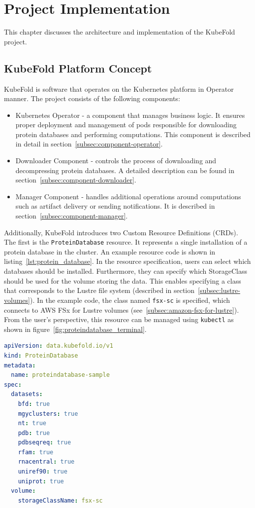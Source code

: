 \chapter{Project Implementation}
This chapter discusses the architecture and implementation of the KubeFold project.


\section{KubeFold Platform Concept}
KubeFold is software that operates on the Kubernetes platform in Operator manner.
The project consists of the following components:
\begin{itemize}
    \item Kubernetes Operator - a component that manages business logic.
    It ensures proper deployment and management of pods responsible for downloading protein databases and performing computations.
    This component is described in detail in section~\ref{subsec:component-operator}.
    \item Downloader Component - controls the process of downloading and decompressing protein databases.
    A detailed description can be found in section~\ref{subsec:component-downloader}.
    \item Manager Component - handles additional operations around computations such as artifact delivery or sending notifications.
    It is described in section~\ref{subsec:component-manager}.
\end{itemize}

Additionally, KubeFold introduces two Custom Resource Definitions (CRDs).
The first is the \texttt{ProteinDatabase} resource.
It represents a single installation of a protein database in the cluster.
An example resource code is shown in listing~\ref{lst:protein_database}.
In the resource specification, users can select which databases should be installed.
Furthermore, they can specify which StorageClass should be used for the volume storing the data.
This enables specifying a class that corresponds to the Lustre file system (described in section~\ref{subsec:lustre-volumes}).
In the example code, the class named \texttt{fsx-sc} is specified, which connects to AWS FSx for Lustre volumes (see~\ref{subsec:amazon-fsx-for-lustre}).
From the user's perspective, this resource can be managed using \texttt{kubectl} as shown in figure~\ref{fig:proteindatabase_terminal}.

\begin{lstlisting}[language=yaml,caption={Przykładowy kod YAML zasobu ProteinDatabase},label={lst:protein_database}]
apiVersion: data.kubefold.io/v1
kind: ProteinDatabase
metadata:
  name: proteindatabase-sample
spec:
  datasets:
    bfd: true
    mgyclusters: true
    nt: true
    pdb: true
    pdbseqreq: true
    rfam: true
    rnacentral: true
    uniref90: true
    uniprot: true
  volume:
    storageClassName: fsx-sc
\end{lstlisting}

